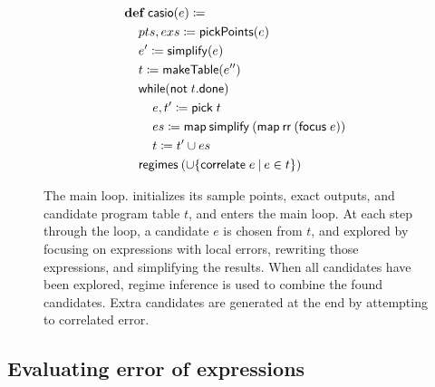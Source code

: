 \documentclass[paper.tex]{subfiles}
\begin{document}
\begin{figure}
\begin{footnotesize}
\begin{align*}
  &\!def!\:\|casio|(e) \ceq \\
  &\> pts, exs \ceq \|pickPoints|(e) \\
  &\> e' \ceq \|simplify|(e) \\
  &\> t \ceq \|makeTable|(e'') \\
  &\> \|while|(\|not| \; t.\|done|) \\
  &\> \> e, t' \ceq \|pick|\;t \\
  &\> \> es \ceq \|map|\:\|simplify|\:(\|map|\:\|rr|\:(\|focus|\;e)) \\
  &\> \> t \ceq t' \cup es \\
  &\> \|regimes|\:(\cup\{\|correlate|\;e \I e \in t \})
\end{align*}
\end{footnotesize}
\caption{The \casio main loop.
  \casio initializes its sample points, exact outputs,
    and candidate program table $t$, and enters the main loop.
  At each step through the loop, a candidate $e$ is chosen from $t$,
    and explored by focusing on expressions with local errors,
    rewriting those expressions, and simplifying the results.
  When all candidates have been explored,
    regime inference is used to combine the found candidates.
  Extra candidates are generated at the end by attempting to correlated error.}
\label{alg:main}
\end{figure}

\subsection{Evaluating error of expressions}
\end{document}
